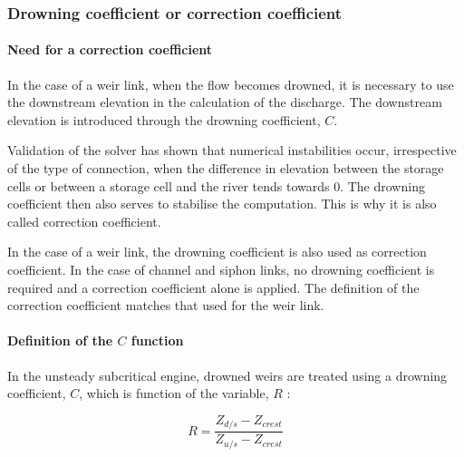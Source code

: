 \subsubsection{Drowning coefficient or correction coefficient}

\label{CoefAct}

\paragraph{Need for a correction coefficient\\}

\hspace*{1cm}

In the case of a weir link, when the flow becomes drowned, it is necessary to use the downstream elevation in the calculation of the discharge. The downstream elevation is introduced through the drowning coefficient, $C$.

\vspace{0.5cm}

Validation of the solver \cite{RISSOAN02} has shown that numerical instabilities occur, irrespective of the type of connection, when the difference in elevation between the storage cells or between a storage cell and the river tends towards 0. The drowning coefficient then also serves to stabilise the computation. This is why it is also called correction coefficient.

\vspace{0.5cm}

In the case of a weir link, the drowning coefficient is also used as correction coefficient. In the case of channel and siphon links, no drowning coefficient is required and a correction coefficient alone is applied.
The definition of the correction coefficient matches that used for the weir link.

\paragraph{Definition of the $C$ function\\}

\hspace*{1cm}

In the unsteady subcritical engine, drowned weirs are treated using a drowning coefficient, $C$, which is function of the variable, $R$ :

\begin{equation}
  R = \frac{Z_{d/s}-Z_{crest}}{Z_{u/s}-Z_{crest}}
\end{equation}


